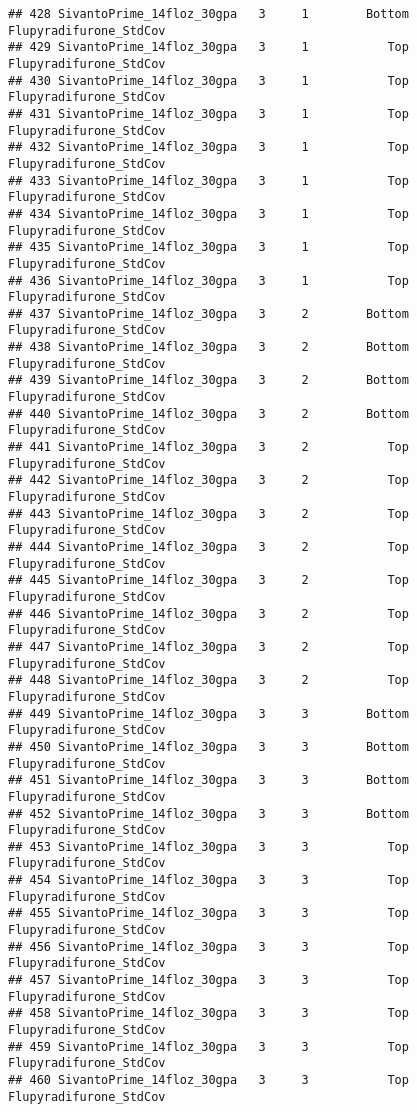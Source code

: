 \documentclass[
]{article}
\begin{document}
\begin{verbatim}
## 428 SivantoPrime_14floz_30gpa   3     1        Bottom Flupyradifurone_StdCov
## 429 SivantoPrime_14floz_30gpa   3     1           Top Flupyradifurone_StdCov
## 430 SivantoPrime_14floz_30gpa   3     1           Top Flupyradifurone_StdCov
## 431 SivantoPrime_14floz_30gpa   3     1           Top Flupyradifurone_StdCov
## 432 SivantoPrime_14floz_30gpa   3     1           Top Flupyradifurone_StdCov
## 433 SivantoPrime_14floz_30gpa   3     1           Top Flupyradifurone_StdCov
## 434 SivantoPrime_14floz_30gpa   3     1           Top Flupyradifurone_StdCov
## 435 SivantoPrime_14floz_30gpa   3     1           Top Flupyradifurone_StdCov
## 436 SivantoPrime_14floz_30gpa   3     1           Top Flupyradifurone_StdCov
## 437 SivantoPrime_14floz_30gpa   3     2        Bottom Flupyradifurone_StdCov
## 438 SivantoPrime_14floz_30gpa   3     2        Bottom Flupyradifurone_StdCov
## 439 SivantoPrime_14floz_30gpa   3     2        Bottom Flupyradifurone_StdCov
## 440 SivantoPrime_14floz_30gpa   3     2        Bottom Flupyradifurone_StdCov
## 441 SivantoPrime_14floz_30gpa   3     2           Top Flupyradifurone_StdCov
## 442 SivantoPrime_14floz_30gpa   3     2           Top Flupyradifurone_StdCov
## 443 SivantoPrime_14floz_30gpa   3     2           Top Flupyradifurone_StdCov
## 444 SivantoPrime_14floz_30gpa   3     2           Top Flupyradifurone_StdCov
## 445 SivantoPrime_14floz_30gpa   3     2           Top Flupyradifurone_StdCov
## 446 SivantoPrime_14floz_30gpa   3     2           Top Flupyradifurone_StdCov
## 447 SivantoPrime_14floz_30gpa   3     2           Top Flupyradifurone_StdCov
## 448 SivantoPrime_14floz_30gpa   3     2           Top Flupyradifurone_StdCov
## 449 SivantoPrime_14floz_30gpa   3     3        Bottom Flupyradifurone_StdCov
## 450 SivantoPrime_14floz_30gpa   3     3        Bottom Flupyradifurone_StdCov
## 451 SivantoPrime_14floz_30gpa   3     3        Bottom Flupyradifurone_StdCov
## 452 SivantoPrime_14floz_30gpa   3     3        Bottom Flupyradifurone_StdCov
## 453 SivantoPrime_14floz_30gpa   3     3           Top Flupyradifurone_StdCov
## 454 SivantoPrime_14floz_30gpa   3     3           Top Flupyradifurone_StdCov
## 455 SivantoPrime_14floz_30gpa   3     3           Top Flupyradifurone_StdCov
## 456 SivantoPrime_14floz_30gpa   3     3           Top Flupyradifurone_StdCov
## 457 SivantoPrime_14floz_30gpa   3     3           Top Flupyradifurone_StdCov
## 458 SivantoPrime_14floz_30gpa   3     3           Top Flupyradifurone_StdCov
## 459 SivantoPrime_14floz_30gpa   3     3           Top Flupyradifurone_StdCov
## 460 SivantoPrime_14floz_30gpa   3     3           Top Flupyradifurone_StdCov

\end{verbatim}
\end{document}
